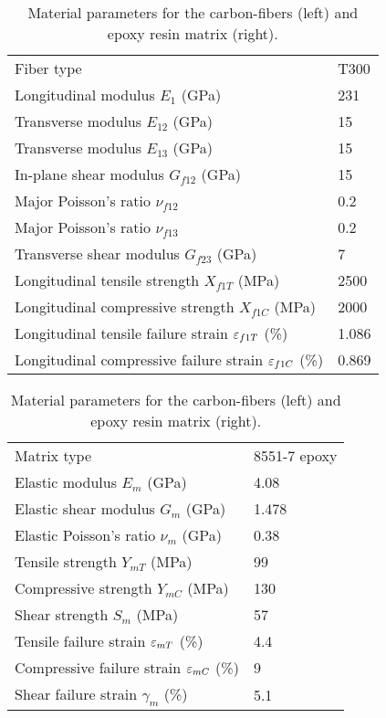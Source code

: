 \documentclass[a4paper,twosided,11pt,DIV14]{scrartcl}
\newcommand{\veps}{\vareps}
\begin{document}
\begin{table}[H]
  \centering
  \begin{minipage}{0.45\textwidth}
    \footnotesize
  \begin{tabular}{p{}p{}}
    \toprule
    Fiber type & T300\\
    Longitudinal modulus $E_{1}$ (GPa) & 231\\
    Transverse modulus $E_{12}$ (GPa) & 15\\
    Transverse modulus $E_{13}$ (GPa) & 15\\
    In-plane shear modulus $G_{f12}$ (GPa) & 15\\
    Major Poisson's ratio $\nu_{f12}$ & 0.2\\
    Major Poisson's ratio $\nu_{f13}$ & 0.2\\
    Transverse shear modulus $G_{f23}$ (GPa) & 7\\
    Longitudinal tensile strength $X_{f1T}$ (MPa) & 2500\\
    Longitudinal compressive strength $X_{f1C}$ (MPa) & 2000\\
    Longitudinal tensile failure strain $\veps_{f1T}$ (\%) & 1.086\\
    Longitudinal compressive failure strain $\veps_{f1C}$ (\%) & 0.869\\
    \bottomrule
  \end{tabular}
  \end{minipage}
  \begin{minipage}{0.45\textwidth}
    \footnotesize
  \begin{tabular}{p{}p{}}
    \toprule
    Matrix type & 8551-7 epoxy\\
    Elastic modulus $E_{m}$ (GPa) & 4.08\\
    Elastic shear modulus $G_{m}$ (GPa) & 1.478\\
    Elastic Poisson's ratio $\nu_{m}$ (GPa) & 0.38\\
    Tensile strength $Y_{mT}$ (MPa) & 99\\
    Compressive strength $Y_{mC}$ (MPa) & 130\\
    Shear strength $S_{m}$ (MPa) & 57\\
    Tensile failure strain $\veps_{mT}$ (\%) & 4.4\\
    Compressive failure strain $\veps_{mC}$ (\%) & 9\\
    Shear failure strain $\gamma_{m}$ (\%) & 5.1\\
    \bottomrule
  \end{tabular}
  \end{minipage}
  \caption{Material parameters for the carbon-fibers (left) and epoxy resin
    matrix (right).}
\end{table}
\end{document}
